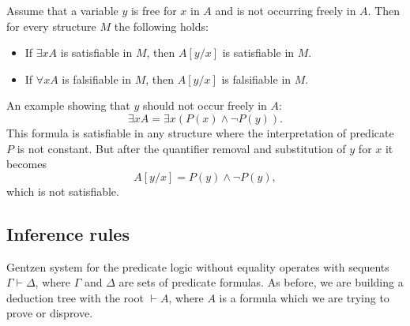 \begin{page}
\setcounter{section}{2}
\setcounter{subsection}{1}
\setcounter{dfn}{3}
\label{portion:544}

\begin{lem}
\label{lem:VarSubstitute}
Assume that a variable $y$ is free for $x$ in $A$ and is not occurring freely in $A$.
Then for every structure $M$ the following holds:
\begin{itemize}
\item
If $\exists x A$ is satisfiable in $M$, then $A[y/x]$ is satisfiable in $M$.
\item
If $\forall x A$ is falsifiable in $M$, then $A[y/x]$ is falsifiable in $M$.
\end{itemize}
\end{lem}

\end{page}

\begin{page}
\setcounter{section}{2}
\setcounter{subsection}{2}
\setcounter{dfn}{3}
\label{portion:545}


An example showing that $y$ should not occur freely in $A$:
\[
\exists x A = \exists x (P(x) \wedge \neg P(y)).
\]
This formula is satisfiable in any structure where the interpretation of predicate $P$ is not constant.
But after the quantifier removal and substitution of $y$ for $x$ it becomes
\[
A[y/x] = P(y) \wedge \neg P(y),
\]
which is not satisfiable.








\end{page}

\begin{page}
\setcounter{section}{2}
\setcounter{subsection}{2}
\setcounter{dfn}{3}
\label{portion:546}

\subsection{Inference rules}
Gentzen system for the predicate logic without equality operates with sequents $\Gamma \vdash \Delta$,
where $\Gamma$ and $\Delta$ are sets of predicate formulas.
As before, we are building a deduction tree with the root $\vdash A$,
where $A$ is a formula which we are trying to prove or disprove.


\end{page}

